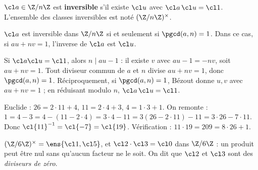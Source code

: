 \begin{definition}
$\cl a\in\Z/n\Z$ est \textbf{inversible} s'il existe $\cl u$ avec $\cl a\,\cl u=\cl 1$. L'ensemble des classes inversibles est noté $(\Z/n\Z)^\times$.
\end{definition}
\begin{theoreme}[Inversibles de $\Z/n\Z$]\label{thm-inversibles}
$\cl a$ est inversible dans $\Z/n\Z$ si et seulement si $\pgcd(a,n)=1$. Dans ce cas, si $au+nv=1$, l'inverse de $\cl a$ est $\cl u$.
\end{theoreme}
\begin{preuve}
Si $\cl a\cl u=\cl1$, alors $n\mid au-1$ : il existe $v$ avec $au-1=-nv$, soit $au+nv=1$. Tout diviseur commun de $a$ et $n$ divise $au+nv=1$, donc $\pgcd(a,n)=1$. Réciproquement, si $\pgcd(a,n)=1$, Bézout donne $u,v$ avec $au+nv=1$ ; en réduisant modulo $n$, $\cl a\,\cl u=\cl 1$.
\end{preuve}
\begin{exemple}
Euclide : $26=2\cdot 11+4$, $11=2\cdot4+3$, $4=1\cdot3+1$. On remonte : $1=4-3=4-(11-2\cdot4)=3\cdot4-11=3(26-2\cdot11)-11=3\cdot26-7\cdot11$. Donc $\cl{11}^{-1}=\cl{-7}=\cl{19}$. Vérification : $11\cdot19=209=8\cdot26+1$.
\end{exemple}
\begin{exemple}
$(\Z/6\Z)^\times=\ens{\cl1,\cl5}$, et $\cl2\cdot\cl3=\cl0$ dans $\Z/6\Z$ : un produit peut être nul sans qu'aucun facteur ne le soit. On dit que $\cl2$ et $\cl 3$ sont des \emph{diviseurs de zéro}.
\end{exemple}

